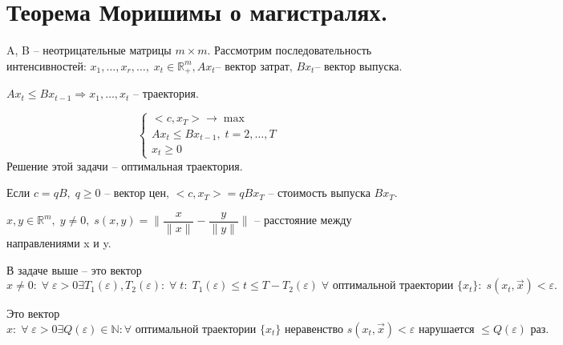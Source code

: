 \chapter{Теорема Моришимы о магистралях.}\label{cha:17}

A, B -- неотрицательные матрицы $m \times m$. Рассмотрим последовательность интенсивностей: $x_1, \ldots, x_r, \ldots, \; x_t \in \mathbb{R}^m_+, Ax_t \text{-- вектор затрат, } Bx_t \text{-- вектор выпуска.}$

\begin{definition}
	$Ax_t \leq Bx_{t-1} \Rightarrow x_1, \ldots, x_t$ -- траектория.
\end{definition}

\begin{problem}
	$$\begin{cases}
		<c, x_T> \to \max\\
		Ax_t \leq B x_{t - 1}, \; t = 2, \ldots, T\\
		x_t \geq 0
	\end{cases}$$ Решение этой задачи -- оптимальная траектория.
\end{problem}

\begin{remark}
	Если $c = qB, \; q \geq 0 \text{ -- вектор цен, } <c, x_T> = qBx_{T}$ -- стоимость выпуска $Bx_T.$
\end{remark}

\begin{sign}
	$x, y \in \mathbb{R}^m, \; y \neq 0, \; s(x, y) = \| \dfrac{x}{\| x \|} - \dfrac{y}{\| y \|}\|$ -- расстояние между направлениями x и y.
\end{sign}

\begin{definition}[Магистраль]
	В задаче выше -- это вектор $x \neq 0: \; \forall \; \varepsilon > 0 \exists T_1(\varepsilon), T_2(\varepsilon): \; \forall \; t: \; T_1(\varepsilon) \leq t \leq T - T_2(\varepsilon) \; \forall \text{ оптимальной траектории } \{ x_t\}: \; s(x_t, \vec{x}) < \varepsilon.$
\end{definition}

\begin{definition}
	Это вектор $x: \; \forall \; \varepsilon > 0 \exists Q(\varepsilon) \in \mathbb{N}: \forall \text{ оптимальной траектории } \{ x_t\} \text{ неравенство } s(x_t, \vec{x}) < \varepsilon \text{ нарушается } \leq Q(\varepsilon) \text{ раз.}$
\end{definition}

